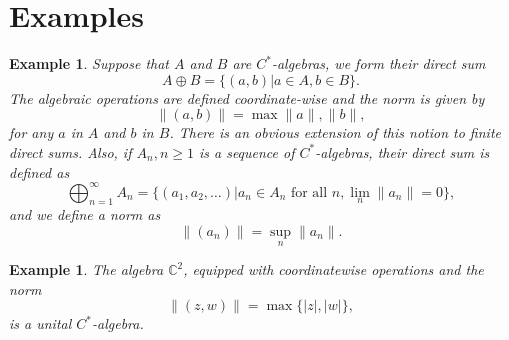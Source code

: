 \documentclass{book}
\newtheorem{example}[definition]{Example}
\def\cstar{\(C^*\)-algebra}
\def\cstars{\(C^*\)-algebras}
\begin{document}
\section{Examples}
\begin{example}\label{example:125}
  Suppose that \(A\) and \(B\) are \cstars, we form their direct
  sum
  \[A\oplus B=\{(a,b) | a \in A,b \in B\}.\]
  The algebraic operations are defined coordinate-wise and the norm is
  given by
  \[\|(a, b)\| = \max{\|a\| , \|b\| },\]
  for any \(a\) in \(A\) and \(b\) in \(B\).
  There is an obvious extension of this notion to finite direct sums. Also,
  if \(A_n,n \geq 1\) is a sequence of \cstars, their direct sum is defined as
  \[
  \bigoplus^\infty_{n=1} A_n = \{(a_1,a_2,\ldots) | a_n \in A_n\text{ for all }n, \lim_n\|a_n\| =0\},
  \]
  and we define a norm as
  \[
    \|(a_n)\|=\sup_n\|a_n\|.
  \]
\end{example}
\begin{example}
The algebra \(\mathbb C^2\), equipped with coordinatewise operations and the norm
\[
\|(z,w)\|=\max\{|z|,|w|\},
\]
is a unital \cstar.
\end{example}
\end{document}
